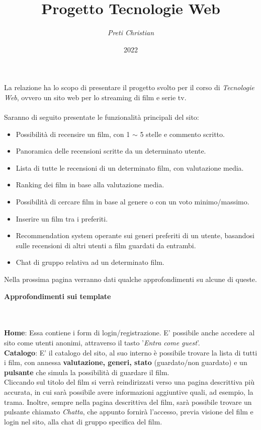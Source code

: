 \documentclass[12pt]{article}
\begin{document}
 \noindent
	\title{\Huge \textbf{Progetto Tecnologie Web}}
	\author{\textit{Preti Christian}}
	\date{2022}
	\maketitle 
	\noindent La relazione ha lo scopo di presentare il progetto svolto per il corso di \textit{Tecnologie Web}, ovvero un sito web per lo streaming di film e serie tv. \\ \\
	
	\noindent Saranno di seguito presentate le funzionalità principali del sito: \\
	\begin{itemize}
		\item Possibilità di recensire un film, con 1 $\sim$ 5 stelle e commento scritto.
		\item Panoramica delle recensioni scritte da un determinato utente.
		\item Lista di tutte le recensioni di un determinato film, con valutazione media.
		\item Ranking dei film in base alla valutazione media.
		\item Possibilità di cercare film in base al genere o con un voto minimo/massimo.
		\item Inserire un film tra i preferiti.
		\item Recommendation system operante sui generi preferiti di un utente, basandosi sulle recensioni di altri utenti a film guardati da entrambi.
		\item Chat di gruppo relativa ad un determinato film. \\
	\end{itemize}
	
	\noindent Nella prossima pagina verranno dati qualche approfondimenti su alcune di queste. 
	\pagebreak
	
	
	
	\noindent \centerline {\Huge \textbf{Approfondimenti sui template}} \\ \\
	
	\noindent \textbf{Home}: Essa contiene i form di login/registrazione. E' possibile anche accedere al sito come utenti anonimi, attraverso il tasto '\textit{Entra come guest}'. \\
	
	\noindent \textbf{Catalogo}: E' il catalogo del sito, al suo interno è possibile trovare la lista di tutti i film, con annessa \textbf{valutazione, generi, stato} (guardato/non guardato) e un \textbf{pulsante} che simula la possibilità di guardare il film. \\
	Cliccando sul titolo del film si verrà reindirizzati verso una pagina descrittiva più accurata, in cui sarà possibile avere informazioni aggiuntive quali, ad esempio, la trama. Inoltre, sempre nella pagina descrittiva del film, sarà possibile trovare un pulsante chiamato \textit{Chatta}, che appunto fornirà l'accesso, previa visione del film e login nel sito, alla chat di gruppo specifica del film. \\
	
\end{document}
